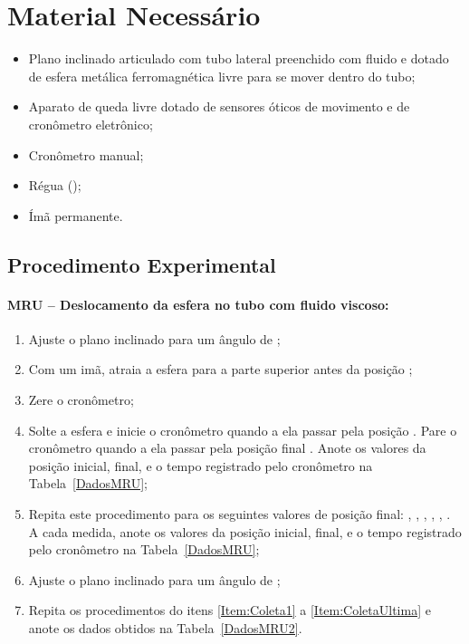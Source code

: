 \section{Material Necessário}

\begin{itemize}
	\item Plano inclinado articulado com tubo lateral preenchido com fluido e dotado de esfera metálica ferromagnética livre para se mover dentro do tubo;
	\item Aparato de queda livre dotado de sensores óticos de movimento e de cronômetro eletrônico;
	\item Cronômetro manual;
	\item Régua ();
	\item Ímã permanente.
\end{itemize}

\subsection{Procedimento Experimental}

\paragraph{MRU -- Deslocamento da esfera no tubo com fluido viscoso:}

\begin{enumerate}
	\item Ajuste o plano inclinado para um ângulo de ;
	\item Com um imã, atraia a esfera para a parte superior antes da posição ;\label{Item:Coleta1}
	\item Zere o cronômetro;
	\item Solte a esfera e inicie o cronômetro quando a ela passar pela posição . Pare o cronômetro quando a ela passar pela posição final . Anote os valores da posição inicial, final, e o tempo registrado pelo cronômetro na Tabela~\ref{DadosMRU};
	\item Repita este procedimento para os seguintes valores de posição final: , , , , , . A cada medida, anote os valores da posição inicial, final, e o tempo registrado pelo cronômetro na Tabela~\ref{DadosMRU};\label{Item:ColetaUltima}
	\item Ajuste o plano inclinado para um ângulo de ;
	\item Repita os procedimentos do itens \ref{Item:Coleta1} a \ref{Item:ColetaUltima} e anote os dados obtidos na Tabela~\ref{DadosMRU2}.
\end{enumerate}

